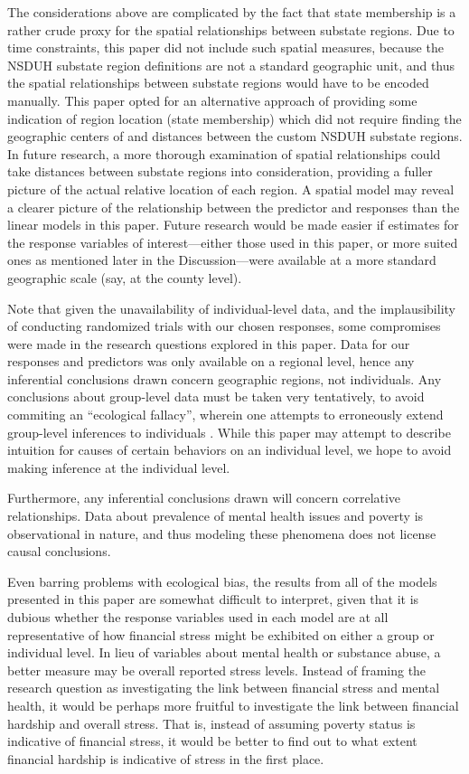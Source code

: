 \documentclass{article}
\begin{document}
The considerations above are complicated by the fact that
state membership is a rather crude proxy for the spatial relationships
between substate regions.
Due to time constraints, this paper did not include such spatial measures,
because the NSDUH substate region definitions
are not a standard geographic unit,
and thus the spatial relationships between substate regions
would have to be encoded manually.
This paper opted for an alternative approach of
providing some indication of region location (state membership)
which did not require finding the geographic centers of
and distances between the custom NSDUH substate regions.
In future research,
a more thorough examination of spatial relationships
could take distances between substate regions into consideration,
providing a fuller picture of the actual relative location
of each region.
A spatial model may reveal a clearer picture of the relationship
between the predictor and responses
than the linear models in this paper.
Future research would be made easier if estimates for
the response variables of interest---either those
used in this paper, or more suited ones as mentioned
later in the Discussion---were available
at a more standard geographic scale
(say, at the county level).

Note that given the unavailability of individual-level data,
and the implausibility of conducting randomized trials with our chosen responses,
some compromises were made in the research questions explored in this paper.
Data for our responses and predictors was only available on a regional level,
hence any inferential conclusions drawn
concern geographic regions, not individuals.
Any conclusions about group-level data must be taken very tentatively,
to avoid commiting an ``ecological fallacy'',
wherein one attempts to erroneously extend group-level inferences
to individuals
\cite{piantadosi_1988}.
While this paper may attempt to describe
intuition for causes of certain behaviors on an individual
level, we hope to avoid making inference at the individual level.

Furthermore, any inferential conclusions drawn will concern correlative
relationships.
Data about prevalence of mental health issues and poverty is observational
in nature, and thus modeling these phenomena does not license causal
conclusions.

Even barring problems with ecological bias,
the results from all of the models presented in this paper
are somewhat difficult to interpret,
given that it is dubious whether the response variables
used in each model are at all representative
of how financial stress might be exhibited
on either a group or individual level.
In lieu of variables about mental health or substance abuse,
a better measure may be overall reported stress levels.
Instead of framing the research question as investigating
the link between financial stress and mental health,
it would be perhaps more fruitful to investigate
the link between financial hardship
and overall stress.
That is, instead of assuming poverty status
is indicative of financial stress,
it would be better to find out to what extent
financial hardship is indicative of stress
in the first place.
\end{document}
